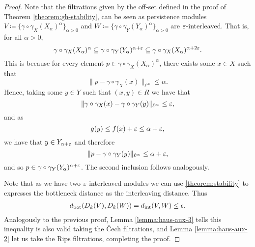 \begin{proof}
    Note that the filtrations given by the off-set defined in the proof of Theorem \ref{theorem:gh-stability}, can be seen as persistence modules $ V \coloneq \{\gamma \circ \gamma_X(X_\alpha)^\alpha\}_{\alpha > 0}$ and $ W \coloneq \{\gamma \circ \gamma_Y(Y_\alpha)^\alpha\}_{\alpha > 0}$ are $\varepsilon$-interleaved. That is, for all $ \alpha > 0 $,
    \begin{equation}
        \gamma \circ \gamma_X(X_\alpha)^\alpha \subseteq \gamma \circ \gamma_Y(Y_\alpha)^{\alpha + \varepsilon} \subseteq \gamma \circ \gamma_X(X_\alpha)^{\alpha + 2\varepsilon}.
    \end{equation}
    This is because for every element $ p \in \gamma \circ \gamma_X(X_\alpha)^\alpha $, there exists some $ x \in X $ such that
    \begin{equation}
        \|p - \gamma \circ \gamma_X(x) \|_{\ell^\infty} \leq \alpha.
    \end{equation}
    Hence, taking some $ y \in Y $ such that $ (x, y) \in R $ we have that
    \begin{equation}
        \| \gamma \circ \gamma_X(x) - \gamma \circ \gamma_Y(y) \|_{\ell^\infty} \leq \varepsilon,
    \end{equation}
    and as
    \begin{equation}
        g(y) \leq f(x) + \varepsilon \leq \alpha + \varepsilon,
    \end{equation}
    we have that $ y \in Y_{\alpha + \varepsilon} $ and therefore
    \begin{equation}
        \| p - \gamma \circ \gamma_Y(y) \|_{\ell^\infty} \leq \alpha + \varepsilon,
    \end{equation}
    and so $ p \in \gamma \circ \gamma_Y(Y_\alpha)^{\alpha + \varepsilon} $. The second inclusion follows analogously.

    Note that as we have two $\varepsilon$-interleaved modules we can use \ref{theorem:stability} to expresses the bottleneck distance as the interleaving distance. Thus
    \begin{align}
        d_{\operatorname{bot}}(D_k(V), D_k(W)) = d_{\operatorname{int}}(V, W) \leq \epsilon.
    \end{align}
    Analogously to the previous proof, Lemma \ref{lemma:haus-aux-3} tells this inequality is also valid taking the Čech filtrations, and Lemma \ref{lemma:haus-aux-2} let us take the Rips filtrations, completing the proof.
\end{proof}